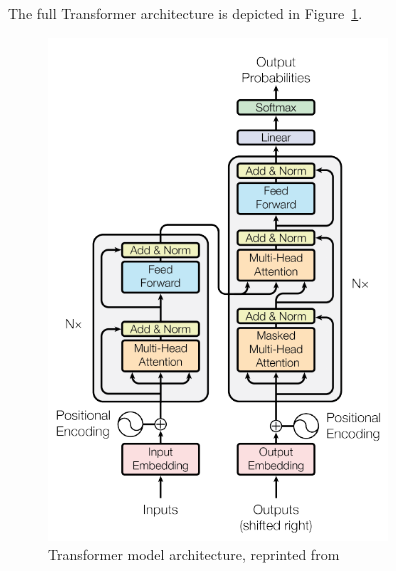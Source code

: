 The full Transformer architecture is depicted in Figure~\ref{fig:transformer}.
\begin{figure}
\includegraphics[width=9cm]{fig/transformer.pdf}
\caption{Transformer model architecture, reprinted from~\cite{vaswani}}
\label{fig:transformer}
\end{figure}




